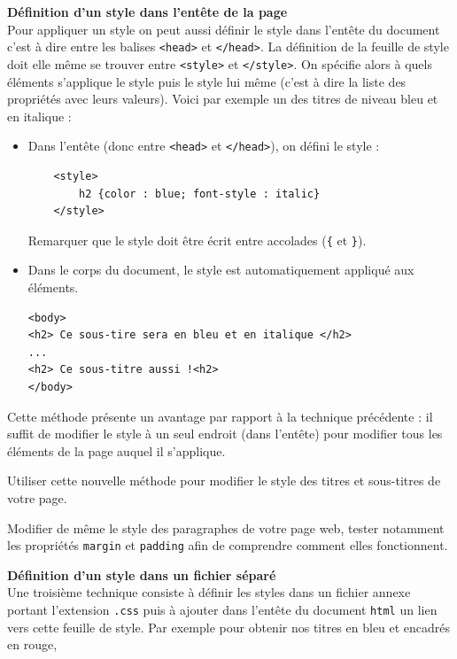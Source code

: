 \documentclass[11pt,a4paper]{article}
\begin{document}
\item \textbf{Définition d'un style dans l'entête de la page}\\
Pour appliquer un style on peut aussi définir le style dans l'entête du document c'est à dire entre les balises \texttt{<head>} et \texttt{</head>}. La définition de la feuille de style doit elle même se trouver entre \texttt{<style>} et \texttt{</style>}. On spécifie alors à quels éléments s'applique le style puis le style lui même (c'est à dire la liste des propriétés avec leurs valeurs). Voici par exemple un des titres de niveau bleu et en italique :
\begin{itemize}
	\item Dans l'entête (donc entre \texttt{<head>} et \texttt{</head>}), on défini le style :
	      \begin{lstlisting}
    <style>
        h2 {color : blue; font-style : italic}
    </style>
\end{lstlisting}
	      \danger \; Remarquer que le style doit être écrit entre accolades ({\tt \{} et {\tt \}}).
	\item Dans le corps du document, le style est automatiquement appliqué aux éléments.
	      \begin{lstlisting}
<body>
<h2> Ce sous-tire sera en bleu et en italique </h2>
...
<h2> Ce sous-titre aussi !<h2>
</body>
\end{lstlisting}
\end{itemize}
Cette méthode présente un avantage par rapport à la technique précédente : il suffit de modifier le style à un seul endroit (dans l'entête) pour modifier tous les éléments de la page auquel il s'applique.
\SQListe
\item Utiliser cette nouvelle méthode pour modifier le style des titres et sous-titres de votre page.
\item Modifier de même le style des paragraphes de votre page web, tester notamment les propriétés {\tt margin} et {\tt padding} afin de comprendre comment elles fonctionnent.
\FinListe
\item \textbf{Définition d'un style dans un fichier séparé}\\
Une troisième technique consiste à définir les styles dans un fichier annexe portant l'extension \texttt{.css} puis à ajouter dans l'entête du document \texttt{html} un lien vers cette feuille de style. Par exemple pour obtenir nos titres en bleu et encadrés en rouge,
\end{document}
